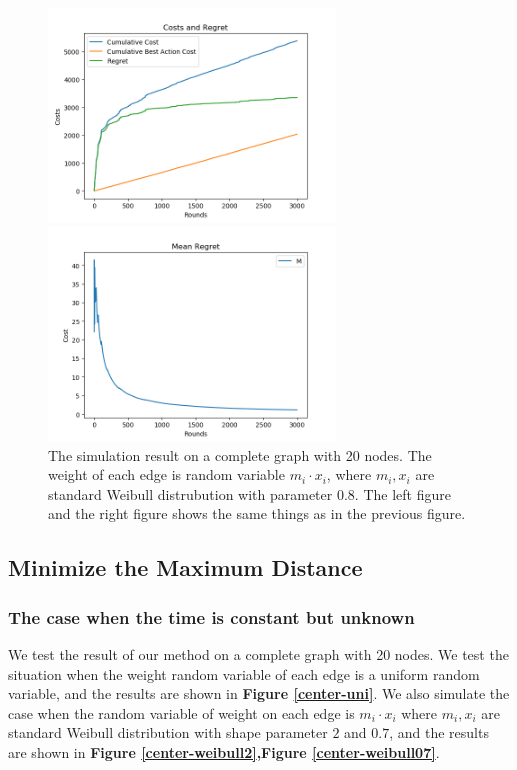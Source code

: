 \documentclass{article}
\theoremstyle{plain}
\theoremstyle{definition}
\theoremstyle{remark}
\begin{document}
    \begin{figure}[htbp!]
        \begin{minipage}[h]{0.5\linewidth}
            \centering
            \includegraphics[width=3in]{spanning-cost-regret-weibull08.png}
        \end{minipage}
        \begin{minipage}[h]{0.5\linewidth}
            \centering
            \includegraphics[width=3in]{spanning-mean-regret-weibull08.png}
        \end{minipage}
        \caption{The simulation result on a complete graph with 20 nodes. The weight of each edge is random variable $m_i \cdot x_i$, where $m_i,x_i$ are standard Weibull distrubution with parameter $0.8$. The left figure and the right figure shows the same things as in the previous figure.}
        \label{spanning-weibull08}
    \end{figure}

    \subsection{Minimize the Maximum Distance}
    \subsubsection{The case when the time is constant but unknown}

    We test the result of our method on a complete graph with 20 nodes. We test the situation when the weight random variable of each edge is a uniform random variable, and the results are shown in \textbf{Figure \ref{center-uni}}. We also simulate the case when the random variable of weight on each edge is $m_i\cdot x_i$ where $m_i,x_i$ are standard Weibull distribution with shape parameter $2$ and $0.7$, and the results are shown in \textbf{Figure \ref{center-weibull2},Figure \ref{center-weibull07}}.\\
    
\end{document}

